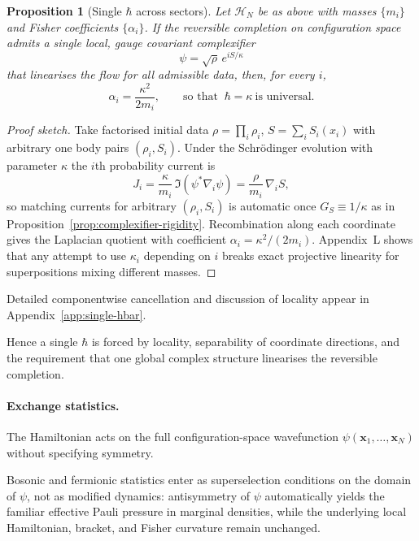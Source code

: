 \documentclass[11pt,a4paper]{article}
\numberwithin{equation}{section}
\theoremstyle{thmcompact}
\newtheorem{proposition}[theorem]{Proposition}
\theoremstyle{remark}
\begin{document}
\begin{proposition}[Single $\hbar$ across sectors]\label{prop:hbarUniversality}
	Let $\mathcal H_N$ be as above with masses $\{m_i\}$ and Fisher coefficients
	$\{\alpha_i\}$. If the reversible completion on configuration space admits a
	single local, gauge covariant complexifier
	\[
	\psi=\sqrt\rho\,e^{iS/\kappa}
	\]
	that linearises the flow for all admissible data, then, for every \(i\),
	\[
	\alpha_i=\frac{\kappa^{2}}{2m_i},\qquad
	\text{so that } \ \hbar=\kappa \ \text{is universal.}
	\]
\end{proposition}

\begin{proof}[Proof sketch]
	Take factorised initial data \(\rho=\prod_i \rho_i\),
	\(S=\sum_i S_i(x_i)\) with arbitrary one body pairs \((\rho_i,S_i)\).
	Under the Schr\"odinger evolution with parameter \(\kappa\) the \(i\)th
	probability current is
	\[
	J_i=\frac{\kappa}{m_i}\,\Im(\psi^{*}\nabla_i\psi)
	=\frac{\rho}{m_i}\,\nabla_i S,
	\]
	so matching currents for arbitrary \((\rho_i,S_i)\) is automatic once
	\(G_S\equiv 1/\kappa\) as in Proposition~\ref{prop:complexifier-rigidity}.
	Recombination along each coordinate gives the Laplacian quotient with
	coefficient \(\alpha_i=\kappa^{2}/(2m_i)\). Appendix~L shows that any
	attempt to use \(\kappa_i\) depending on \(i\) breaks exact projective
	linearity for superpositions mixing different masses.
\end{proof}

Detailed componentwise cancellation and discussion of locality appear in Appendix~\ref{app:single-hbar}.

	 Hence a single $\hbar$ is forced by locality, separability of coordinate directions, and the requirement that one global complex structure linearises the reversible completion.
	
	\paragraph{Exchange statistics.}
	The Hamiltonian acts on the full configuration-space wavefunction $\psi(\mathbf{x}_1,\dots,\mathbf{x}_N)$ without specifying symmetry.
	
	Bosonic and fermionic statistics enter as superselection conditions on the domain of $\psi$, not as modified dynamics: antisymmetry of $\psi$ automatically yields the familiar effective Pauli pressure in marginal densities, while the underlying local Hamiltonian, bracket, and Fisher curvature remain unchanged.
\end{document}
